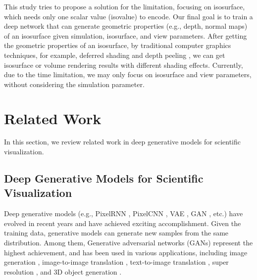 \documentclass[journal]{vgtc}                %
\begin{document}
This study tries to propose a solution for the limitation, focusing on isosurface, which needs only one scalar value (isovalue) to encode. Our final goal is to train a deep network that can generate geometric properties (e.g., depth, normal maps) of an isosurface given simulation, isosurface, and view parameters. After getting the geometric properties of an isosurface, by traditional computer graphics techniques, for example, deferred shading \cite{deering1988triangle} and depth peeling \cite{zolt2003depthpeel}, we can get isosurface or volume rendering results with different shading effects. Currently, due to the time limitation, we may only focus on isosurface and view parameters, without considering the simulation parameter.  

\section{Related Work}

In this section, we review related work in deep generative models for scientific visualization.

\subsection{Deep Generative Models for Scientific Visualization}

Deep generative models (e.g., PixelRNN \cite{oord2016pixel}, PixelCNN \cite{van2016conditional}, VAE \cite{kingma2013auto}, GAN \cite{goodfellow2014generative}, etc.) have evolved in recent years and have achieved exciting accomplishment. Given the training data, generative models can generate new samples from the same distribution. Among them, Generative adversarial networks \cite{goodfellow2014generative} (GANs) represent the highest achievement, and has been used in various applications, including image generation \cite{karras2017progressive, jin2017towards}, image-to-image translation \cite{isola2017image, zhu2017unpaired}, text-to-image translation \cite{zhang2017stackgan, reed2016generative}, super resolution \cite{ledig2017photo}, and 3D object generation \cite{wu2016learning, gadelha20173d}. 
\end{document}
